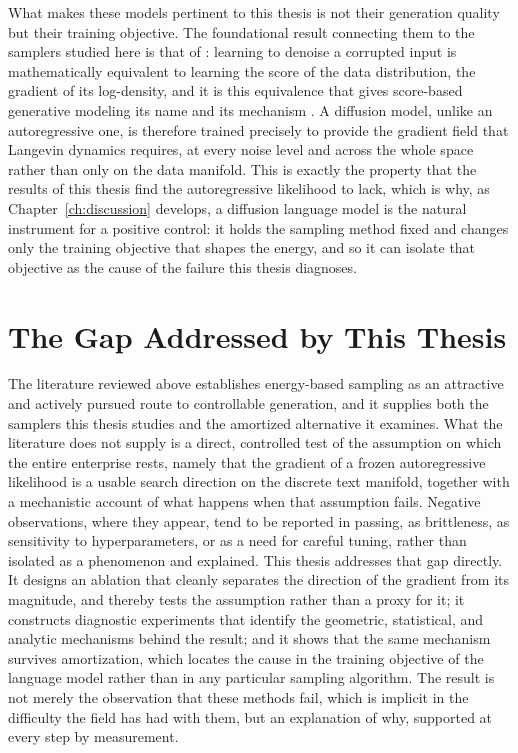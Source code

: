 What makes these models pertinent to this thesis is not their generation quality but their training objective. The foundational result connecting them to the samplers studied here is that of \citet{vincent2011connection}: learning to denoise a corrupted input is mathematically equivalent to learning the score of the data distribution, the gradient of its log-density, and it is this equivalence that gives score-based generative modeling its name and its mechanism \citep{song2019generative, ho2020denoising}. A diffusion model, unlike an autoregressive one, is therefore trained precisely to provide the gradient field that Langevin dynamics requires, at every noise level and across the whole space rather than only on the data manifold. This is exactly the property that the results of this thesis find the autoregressive likelihood to lack, which is why, as Chapter~\ref{ch:discussion} develops, a diffusion language model is the natural instrument for a positive control: it holds the sampling method fixed and changes only the training objective that shapes the energy, and so it can isolate that objective as the cause of the failure this thesis diagnoses.

\section{The Gap Addressed by This Thesis}
\label{sec:rel-gap}

The literature reviewed above establishes energy-based sampling as an attractive and actively pursued route to controllable generation, and it supplies both the samplers this thesis studies and the amortized alternative it examines. What the literature does not supply is a direct, controlled test of the assumption on which the entire enterprise rests, namely that the gradient of a frozen autoregressive likelihood is a usable search direction on the discrete text manifold, together with a mechanistic account of what happens when that assumption fails. Negative observations, where they appear, tend to be reported in passing, as brittleness, as sensitivity to hyperparameters, or as a need for careful tuning, rather than isolated as a phenomenon and explained. This thesis addresses that gap directly. It designs an ablation that cleanly separates the direction of the gradient from its magnitude, and thereby tests the assumption rather than a proxy for it; it constructs diagnostic experiments that identify the geometric, statistical, and analytic mechanisms behind the result; and it shows that the same mechanism survives amortization, which locates the cause in the training objective of the language model rather than in any particular sampling algorithm. The result is not merely the observation that these methods fail, which is implicit in the difficulty the field has had with them, but an explanation of why, supported at every step by measurement.
